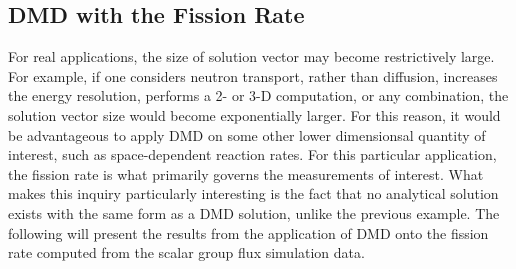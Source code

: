 \documentclass{style/nseJournal}
\begin{document}
\subsection{DMD with the Fission Rate}
For real applications, the size of solution vector may become restrictively large.  
For example, if one considers neutron transport, rather than diffusion, increases the energy resolution,  performs a 2- or 3-D computation, or any combination, the solution vector size would become exponentially larger.  
For this reason, it would be  advantageous to apply DMD on some other lower dimensionsal quantity of interest, such as space-dependent reaction rates.  
For this particular application, the fission rate is what primarily governs the measurements of interest.  
What makes this inquiry particularly interesting is the fact that no analytical solution exists with the same form as a DMD solution, unlike the previous example.  
The following will present the results from the application of DMD onto the fission rate computed from the scalar group flux simulation data.  
\end{document}
